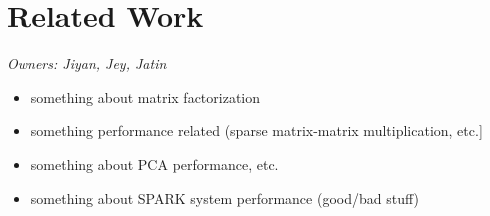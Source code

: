 \section{Related Work}
\textit{Owners: Jiyan, Jey, Jatin}
\begin{itemize}
  \item something about matrix factorization
  \item something performance related (sparse matrix-matrix multiplication, etc.] 
  \item something about PCA performance, etc.
  \item something about SPARK system performance (good/bad stuff)
\end{itemize}
